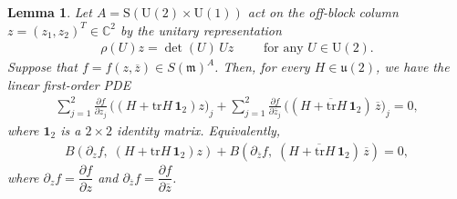 \documentclass[11pt]{amsart}
\newtheorem{lemma}[theorem]{Lemma}
\theoremstyle{definition}
\theoremstyle{plain}
\theoremstyle{conclusion}
\begin{document}
\begin{lemma}
\label{lem:liealge}
Let $A=\mathrm{S}(\mathrm{U}(2) \times \mathrm{U}(1))$ act on the off-block column $z=(z_1,z_2)^T\in\mathbb{C}^2$ by the unitary representation \begin{align}
\rho(U)z=\det(U)\,U z\qquad \text{ for any } U\in \mathrm{U}(2).
\end{align} Suppose that $f=f(z,\overline{z}) \in S(\mathfrak{m})^A$. Then, for every $H\in\mathfrak{u}(2)$, we have the linear first-order PDE \begin{align*}
\sum_{j=1}^2 \frac{\partial f}{\partial z_j}\,\bigl((H+\mathrm{tr}H\,\mathbf{1}_2)z\bigr)_j +  \sum_{j=1}^2 \frac{\partial f}{\partial \overline{z}_j}\,\bigl((\overline{H+\mathrm{tr}H\,\mathbf{1}_2})\,\overline{z}\bigr)_j =0,
\end{align*} where $\mathbf{1}_2$ is a $2 \times 2$ identity matrix. Equivalently,  \begin{align*}
B( \partial_{z}f,\;(H+\mathrm{tr}H\,\mathbf{1}_2)z) + B( \partial_{\overline{z}}f,\;(\overline{H+\mathrm{tr}H\,\mathbf{1}_2})\,\overline{z})=0,
\end{align*} where $\partial_z f = \dfrac{\partial f}{\partial z}$ and $\partial_{\overline{z}} f = \dfrac{\partial f}{\partial \overline{z}} $.
\end{lemma}
\end{document}
